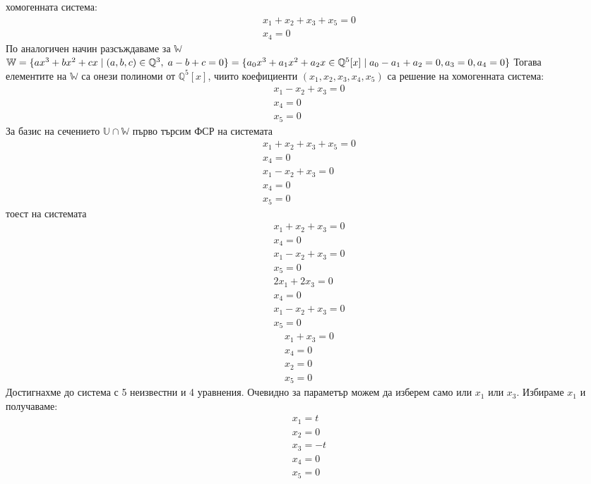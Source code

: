 \documentclass[a4paper, 12pt, oneside]{article}
\begin{document}
хомогенната система:
\begin{align*}
    x_1 + x_2 + x_3 + x_5 = 0 \\
    x_4 = 0
\end{align*}
По аналогичен начин разсъждаваме за \(\mathbb{W}\) \\
\(\mathbb{W} = \{ax^3 + bx^2 + cx \; | \; (a, b, c) \in \mathbb{Q}^3, \; a - b + c = 0\} = \\
\{a_0x^3 + a_1x^2 + a_2x \in \mathbb{Q}^5[x] \; | \;  a_0 - a_1 + a_2 = 0, a_3 = 0, a_4 = 0\}\) Тогава \\
елементите на \(\mathbb{W}\) са онези полиноми от \(\mathbb{Q}^5[x]\), чиито
коефициенти \((x_1, x_2, x_3, x_4, x_5)\) са решение на хомогенната система:
\begin{align*}
    x_1 - x_2 + x_3 = 0 \\
    x_4 = 0 \\
    x_5 = 0
\end{align*}
За базис на сечението \(\mathbb{U} \cap \mathbb{W}\) първо търсим ФСР на системата
\begin{align*}
    x_1 + x_2 + x_3 + x_5 = 0 \\
    x_4 = 0 \\
    x_1 - x_2 + x_3 = 0 \\
    x_4 = 0 \\
    x_5 = 0
\end{align*}
тоест на системата
\begin{align*}
    x_1 + x_2 + x_3 = 0 \\
    x_4 = 0 \\
    x_1 - x_2 + x_3 = 0 \\
    x_5 = 0
\end{align*}
\begin{align*}
    2x_1 + 2x_3 = 0 \\
    x_4 = 0 \\
    x_1 - x_2 + x_3 = 0\\
    x_5 = 0
\end{align*} 
\begin{align*}
    x_1 + x_3 = 0 \\
    x_4 = 0 \\
    x_2 = 0 \\
    x_5 = 0
\end{align*}
Достигнахме до система с 5 неизвестни и 4 уравнения.
Очевидно за параметър можем да изберем само или \(x_1\) или \(x_3\).
Избираме \(x_1\) и получаваме:
\begin{align*}
    x_1 = t \\
    x_2 = 0 \\
    x_3 = -t \\
    x_4 = 0 \\
    x_5 = 0
\end{align*}
\end{document}

